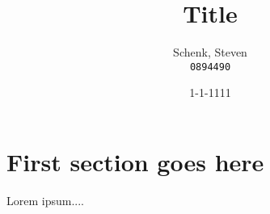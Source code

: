 \documentclass{article}
\title{Title}
\date{1-1-1111}
\author{Schenk, Steven\\
  \texttt{0894490}
  }
\begin{document}
\maketitle
\newpage
{}
\tableofcontents


\newpage
\section{First section goes here}
Lorem ipsum....

\newpage


\end{document}
